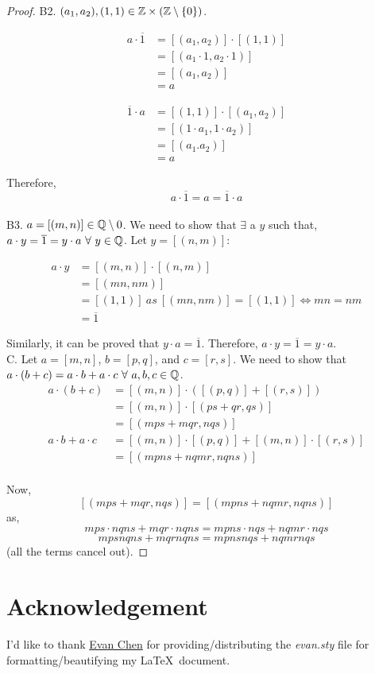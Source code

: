 \documentclass[11pt]{scrartcl}
\begin{document}
\begin{proof}
	B2. $(a_{1}, a_{2}), (1,1) \in \mathbb Z \times (\mathbb Z \setminus \{0\})$.
	
	\begin{align*}
		a \cdot \overline{1} &= [(a_{1}, a_{2})] \cdot [(1,1)]\\
		&= [(a_{1} \cdot 1, a_{2} \cdot 1)]\\
		&= [(a_{1}, a_{2})]\\
		&= a
	\end{align*}

	\begin{align*}
		\overline{1} \cdot a &= [(1,1)] \cdot [(a_{1}, a_{2})]\\
		&= [(1 \cdot a_{1}, 1 \cdot a_{2})]\\
		&= [(a_{1}. a_{2})]\\
		&= a
	\end{align*}

	Therefore, $$a \cdot \overline{1} = a = \overline{1} \cdot a$$\\
	
	B3. $a = [(m,n)] \in \mathbb Q \setminus 0$. We need to show that $\exists$ a $y$ such that, $a \cdot y = \overline{1} = y \cdot a\ \forall\ y \in \mathbb Q$. Let $y = [(n,m)]$:
	
	\begin{align*}
		a \cdot y &= [(m,n)] \cdot [(n,m)]\\
		&= [(mn, nm)]\\
		&= [(1,1)]\ as\ [(mn, nm)] = [(1,1)] \Leftrightarrow mn = nm\\
		&= \overline{1} 
	\end{align*}

	Similarly, it can be proved that $y \cdot a = \overline{1}$. Therefore, $a \cdot y = \overline{1} = y \cdot a$.\\[2pt]
	
	C. Let $a=[m,n]$, $b=[p,q]$, and $c=[r,s]$. We need to show that $a \cdot (b+c) = a \cdot b + a \cdot c\ \forall\ a,b,c \in \mathbb Q$.
	\begin{align*}
		a \cdot (b+c) &= [(m,n)] \cdot ([(p,q)]+[(r,s)]) \\
		&= [(m,n)] \cdot [(ps+qr, qs)]\\
		&= [(mps+mqr, nqs)]\\
		a\cdot b + a\cdot c &= [(m,n)]\cdot [(p,q)] + [(m,n)] \cdot [(r,s)]\\
		&= [(mpns + nqmr, nqns)]\\
	\end{align*}

	Now, $$[(mps+mqr, nqs)] = [(mpns + nqmr, nqns)]$$ as, $$mps \cdot nqns + mqr \cdot nqns = mpns \cdot nqs + nqmr \cdot nqs$$ 
	$$mpsnqns + mqrnqns = mpnsnqs + nqmrnqs$$ (all the terms cancel out).
\end{proof}

	\section{Acknowledgement}
	
	I'd like to thank \href{https://web.evanchen.cc/}{Evan Chen} for providing/distributing the \emph{evan.sty} file for formatting/beautifying my \LaTeX\ document.
	
\end{document}
